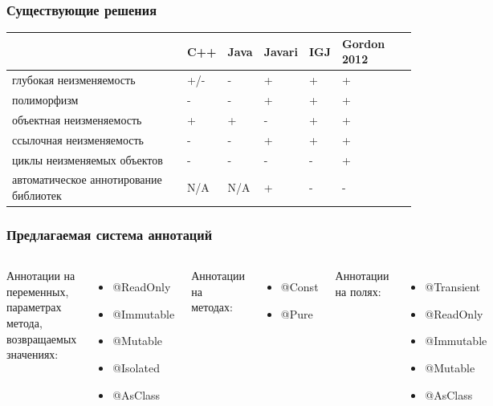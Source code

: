 \documentclass[10pt,pdf,hyperref={unicode}]{beamer}
\begin{document}
\begin{frame}[fragile]
	\transwipe
	\frametitle{Существующие решения}
\begin{center}
	\begin{tabular}{ | p{3.5cm} | p{0.9cm} | p{0.9cm} | p{0.9cm} | p{0.9cm} | p{0.9cm} |}
	\hline  & C++ & Java & Javari & IGJ & Gordon 2012 \\
	\hline глубокая неизменяемость & +/- & - & + & + & + \\
	\hline полиморфизм & - & - & + & + & + \\
	\hline объектная неизменяемость & + & + & - & + & + \\
	\hline ссылочная неизменяемость & - & - & + & + & + \\
	\hline циклы неизменяемых объектов & - & - & - & - & + \\
	\hline автоматическое аннотирование библиотек & N/A & N/A & + & - & - \\
	\hline
    \end{tabular}
\end{center}
	
\end{frame}



\begin{frame}
	\transwipe
	\frametitle{Предлагаемая система аннотаций}
	\begin{columns}[t] 
     Аннотации на переменных, параметрах метода, возвращаемых значениях: 
	\begin{itemize}
	\item @ReadOnly 
	\item @Immutable 
	\item @Mutable
	\item @Isolated 
	\item @AsClass
	\end{itemize}
     Аннотации на методах:
	\begin{itemize}
	\item @Const
	\item @Pure
	\end{itemize}
	Аннотации на полях: 
	\begin{itemize}
	\item @Transient
	\item @ReadOnly
	\item @Immutable
	\item @Mutable
	\item @AsClass
	\end{itemize} 
    \end{columns}
\end{frame}
\end{document}
